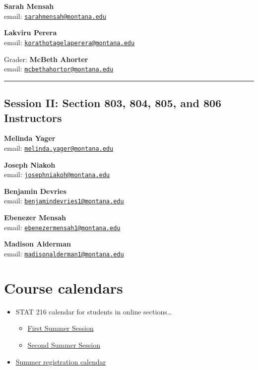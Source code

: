 \documentclass[
]{article}
\providecommand{\tightlist}{%
  \setlength{\itemsep}{0pt}\setlength{\parskip}{0pt}}
\begin{document}
\textbf{Sarah Mensah}\\
email:
\href{mailto:sarahmensah@montana.edu}{\nolinkurl{sarahmensah@montana.edu}}

\textbf{Lakviru Perera}\\
email:
\href{mailto:korathotagelaperera@montana.edu}{\nolinkurl{korathotagelaperera@montana.edu}}

Grader: \textbf{McBeth Ahorter}\\
email:
\href{mailto:mcbethahortor@montana.edu}{\nolinkurl{mcbethahortor@montana.edu}}

\begin{center}\rule{0.5\linewidth}{0.5pt}\end{center}

\subsection{Session II: Section 803, 804, 805, and 806
Instructors}\label{session-ii-section-803-804-805-and-806-instructors}

\textbf{Melinda Yager}\\
email:
\href{mailto:melinda.yager@montana.edu}{\nolinkurl{melinda.yager@montana.edu}}

\textbf{Joseph Niakoh}\\
email:
\href{mailto:josephniakoh@montana.edu}{\nolinkurl{josephniakoh@montana.edu}}

\textbf{Benjamin Devries}\\
email:
\href{mailto:benjamindevries1@montana.edu}{\nolinkurl{benjamindevries1@montana.edu}}

\textbf{Ebenezer Mensah}\\
email:
\href{mailto:ebenezermensah1@montana.edu}{\nolinkurl{ebenezermensah1@montana.edu}}

\textbf{Madison Alderman}\\
email:
\href{mailto:madisonalderman1@montana.edu}{\nolinkurl{madisonalderman1@montana.edu}}

\section{Course calendars}\label{course-calendars}

\begin{itemize}
\tightlist
\item
  STAT 216 calendar for students in online sections\ldots{}

  \begin{itemize}
  \tightlist
  \item
    \href{calendars/Sum1_24-Stat216_Calendar-Online.pdf}{First Summer
    Session}
  \item
    \href{calendars/Sum2_24-Stat216_Calendar-Online.pdf}{Second Summer
    Session}
  \end{itemize}
\item
  \href{https://www.montana.edu/registrar/add_drop_schedule.html}{Summer
  registration calendar}
\end{itemize}
\end{document}
